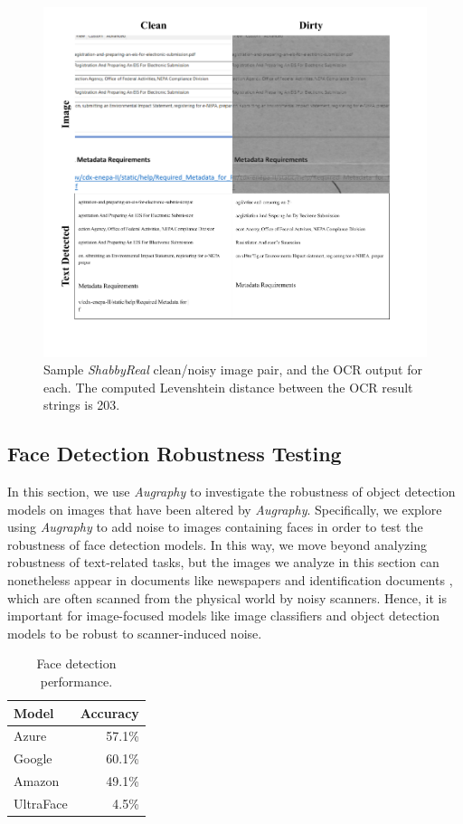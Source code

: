 \documentclass[runningheads]{llncs}
\begin{document}
\begin{figure}
\centering
\includegraphics[width=0.98\columnwidth, frame]{figures/ocr_figure.png}
\caption{Sample \emph{ShabbyReal} clean/noisy image pair, and the OCR output for each. The computed Levenshtein distance between the OCR result strings is 203.}
\label{fig:ocr_output}
\end{figure}

\subsection{Face Detection Robustness Testing}
In this section, we use \emph{Augraphy} to investigate the robustness of object detection models on images that have been altered by \emph{Augraphy}.
Specifically, we explore using \emph{Augraphy} to add noise to images containing faces in order to test the robustness of face detection models.
In this way, we move beyond analyzing robustness of text-related tasks, but the images we analyze in this section can nonetheless appear in documents like newspapers \cite{newspaper-navigator} and identification documents \cite{midv-500}, which are often scanned from the physical world by noisy scanners.
Hence, it is important for image-focused models like image classifiers and object detection models to be robust to scanner-induced noise.

\begin{table}
    \centering
    \caption{Face detection performance.}
    \begin{tabular}{lr}
    \toprule
        \textbf{Model} & \textbf{Accuracy} \\
        \midrule
        Azure & 57.1\%\\
        Google & 60.1\%  \\
        Amazon & 49.1\% \\
        UltraFace & 4.5\%\\
        \bottomrule
    \end{tabular}
    \label{tab:face-detection-results}
\end{table}
\end{document}
